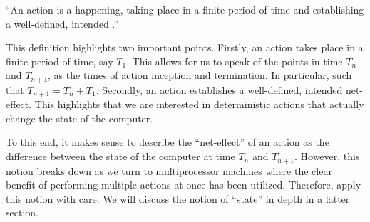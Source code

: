 \begin{definition}

``An action is a happening, taking place in a finite period of time and
establishing a well-defined, intended .''
\cite{dijkstra-introduction}

\end{definition}

This definition highlights two important points. Firstly, an action takes place
in a finite period of time, say $T_1$. This allows for us to speak of the
points in time $T_n$ and $T_{n+1}$, as the times of action inception and
termination.  In particular, such that $T_{n+1}=T_n+T_1$. Secondly, an action
establishes a well-defined, intended net-effect. This highlights that we are
interested in deterministic actions that actually change the state of the
computer.

To this end, it makes sense to describe the ``net-effect'' of an action as the
difference between the state of the computer at time $T_n$ and $T_{n+1}$.
However, this notion breaks down as we turn to multiprocessor machines where
the clear benefit of performing multiple actions at once has been utilized.
Therefore, apply this notion with care. We will discuss the notion of ``state''
in depth in a latter section.


